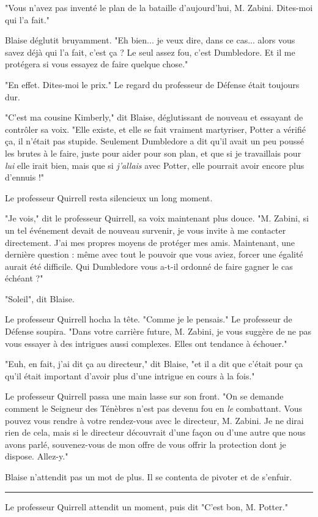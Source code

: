 "Vous n'avez pas inventé le plan de la bataille d'aujourd'hui, M. Zabini. Dites-moi qui l'a fait."

Blaise déglutit bruyamment. "Eh bien... je veux dire, dans ce cas... alors vous savez déjà qui l'a fait, c'est ça ? Le seul assez fou, c'est Dumbledore. Et il me protégera si vous essayez de faire quelque chose."

"En effet. Dites-moi le prix." Le regard du professeur de Défense était toujours dur.

"C'est ma cousine Kimberly," dit Blaise, déglutissant de nouveau et essayant de contrôler sa voix. "Elle existe, et elle se fait vraiment martyriser, Potter a vérifié ça, il n'était pas stupide. Seulement Dumbledore a dit qu'il avait un peu poussé les brutes à le faire, juste pour aider pour son plan, et que si je travaillais pour \emph{lui}  elle irait bien, mais que si \emph{j'allais}  avec Potter, elle pourrait avoir encore plus d'ennuis !"

Le professeur Quirrell resta silencieux un long moment.

"Je vois," dit le professeur Quirrell, sa voix maintenant plus douce. "M. Zabini, si un tel événement devait de nouveau survenir, je vous invite à me contacter directement. J'ai mes propres moyens de protéger mes amis. Maintenant, une dernière question : même avec tout le pouvoir que vous aviez, forcer une égalité aurait été difficile. Qui Dumbledore vous a-t-il ordonné de faire gagner le cas échéant ?"

"Soleil", dit Blaise.

Le professeur Quirrell hocha la tête. "Comme je le pensais." Le professeur de Défense soupira. "Dans votre carrière future, M. Zabini, je vous suggère de ne pas vous essayer à des intrigues aussi complexes. Elles ont tendance à échouer."

"Euh, en fait, j'ai dit ça au directeur," dit Blaise, "et il a dit que c'était pour ça qu'il était important d'avoir plus d'une intrigue en cours à la fois."

Le professeur Quirrell passa une main lasse sur son front. "On se demande comment le Seigneur des Ténèbres n'est pas devenu fou en \emph{le}  combattant. Vous pouvez vous rendre à votre rendez-vous avec le directeur, M. Zabini. Je ne dirai rien de cela, mais si le directeur découvrait d'une façon ou d'une autre que nous avons parlé, souvenez-vous de mon offre de vous offrir la protection dont je dispose. Allez-y."

Blaise n'attendit pas un mot de plus. Il se contenta de pivoter et de s'enfuir.
\par\noindent\rule{\textwidth}{0.4pt}
Le professeur Quirrell attendit un moment, puis dit "C'est bon, M. Potter."

